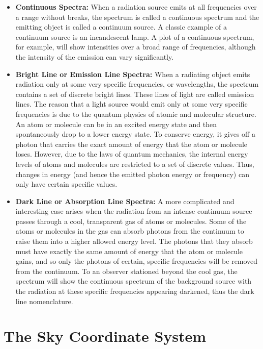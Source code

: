 \documentclass[10pt]{report}
\begin{document}
\begin{itemize}
\item \textbf{Continuous Spectra:} When a radiation source emits at all frequencies over a range without breaks, the spectrum is called a continuous spectrum and the emitting object is called a continuum source.  A classic example of a continuum source is an incandescent lamp. A plot of a continuous spectrum, for example, will show intensities over a broad range of frequencies, although the intensity of the emission can vary significantly. 
\item \textbf{ Bright Line or  Emission Line Spectra:} When a radiating object emits radiation only at some very specific frequencies, or wavelengths, the spectrum contains a set of discrete bright lines. These lines of light are called emission lines.  The reason that a light source would emit only at some very specific frequencies is due to the quantum physics of atomic and molecular structure.  An atom or molecule can be in an excited energy state and then spontaneously drop to a lower energy state.  To conserve energy, it gives off a photon that carries the exact amount of energy that the atom or molecule loses.  However, due to the laws of quantum mechanics, the internal energy levels of atoms and molecules are restricted to a set of discrete values. Thus, changes in energy (and hence the emitted photon energy or frequency) can only have certain specific values.   
 
\item \textbf{ Dark Line or Absorption Line Spectra:} A more complicated and interesting case arises when the radiation from an intense continuum source passes through a cool, transparent gas of atoms or molecules.  Some of the atoms or molecules in the gas can absorb photons from the continuum to raise them into a higher allowed energy level.  The photons that they absorb must have exactly the same amount of energy that the atom or molecule gains, and so only the photons of certain, specific frequencies will be removed from the continuum.  To an observer stationed beyond the cool gas, the spectrum will show the continuous spectrum of the background source with the radiation at these specific frequencies appearing darkened, thus the dark line nomenclature. 
\end{itemize}
\section{The Sky Coordinate System} 
\end{document}
